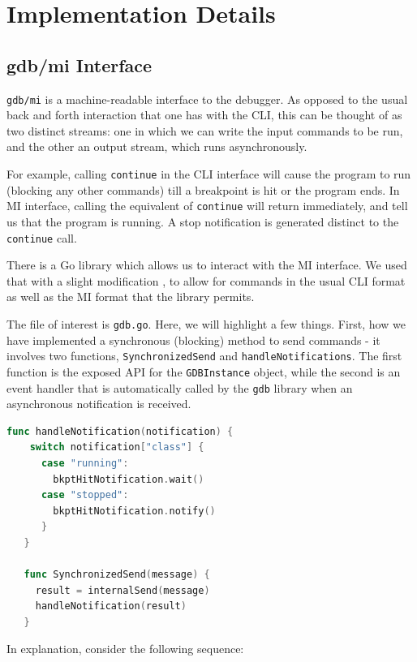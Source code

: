 \documentclass[10pt,conference]{IEEEtran}
\begin{document}
\section{Implementation Details}
\label{sec:impl}

\subsection{gdb/mi Interface}

\texttt{gdb/mi} is a machine-readable interface to the debugger. As opposed to the usual back and forth interaction that one has with the CLI, this can be thought of as two distinct streams: one in which we can write the input commands to be run, and the other an output stream, which runs asynchronously.

For example, calling \texttt{continue} in the CLI interface will cause the program to run (blocking any other commands) till a breakpoint is hit or the program ends. In MI interface, calling the equivalent of \texttt{continue} will return immediately, and tell us that the program is running. A stop notification is generated distinct to the \texttt{continue} call.

There is a Go library \cite{gogdb} which allows us to interact with the MI interface. We used that with a slight modification \cite{gogdbm}, to allow for commands in the usual CLI format as well as the MI format that the library permits.

The file of interest is \texttt{gdb.go}. Here, we will highlight a few things. First, how we have implemented a synchronous (blocking) method to send commands - it involves two functions, \texttt{SynchronizedSend} and \texttt{handleNotifications}. The first function is the exposed API for the \texttt{GDBInstance} object, while the second is an event handler that is automatically called by the \texttt{gdb} library when an asynchronous notification is received.

\begin{samepage}
\begin{lstlisting}[language=Go, caption=Partial pseudocode for Synchronized Send]
  func handleNotification(notification) {
    switch notification["class"] {
      case "running":
        bkptHitNotification.wait()
      case "stopped":
        bkptHitNotification.notify()
      }
   }

   func SynchronizedSend(message) {
     result = internalSend(message)
     handleNotification(result)
   }
\end{lstlisting}
\end{samepage}
In explanation, consider the following sequence:
\end{document}
